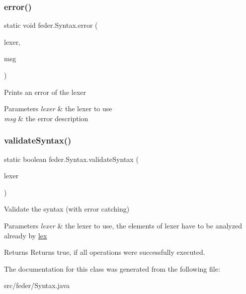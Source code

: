 \subsubsection{\texorpdfstring{error()}{error()}\hspace{0.1cm}{\footnotesize\ttfamily [2/2]}}
{\footnotesize\ttfamily static void feder.\+Syntax.\+error (\begin{DoxyParamCaption}\item[{\hyperlink{classfeder_1_1Lexer}{Lexer}}]{lexer,  }\item[{String}]{msg }\end{DoxyParamCaption})\hspace{0.3cm}{\ttfamily [static]}}

Prints an error of the lexer 
\begin{DoxyParams}{Parameters}
{\em lexer} & the lexer to use \\
\hline
{\em msg} & the error description \\
\hline
\end{DoxyParams}
\mbox{\label{classfeder_1_1Syntax_a1a609489260f826347f03bdd34f94b98}} 
\subsubsection{\texorpdfstring{validate\+Syntax()}{validateSyntax()}}
{\footnotesize\ttfamily static boolean feder.\+Syntax.\+validate\+Syntax (\begin{DoxyParamCaption}\item[{\hyperlink{classfeder_1_1Lexer}{Lexer}}]{lexer }\end{DoxyParamCaption})\hspace{0.3cm}{\ttfamily [static]}}

Validate the syntax (with error catching) 
\begin{DoxyParams}{Parameters}
{\em lexer} & the lexer to use, the elements of lexer have to be analyzed already by \hyperlink{classfeder_1_1Lexer_a69679a02624d16be3b567fd2aa71be57}{lex } \\
\hline
\end{DoxyParams}
\begin{DoxyReturn}{Returns}
Returns true, if all operations were successfully executed. 
\end{DoxyReturn}


The documentation for this class was generated from the following file\+:\begin{DoxyCompactItemize}
\item 
src/feder/Syntax.\+java\end{DoxyCompactItemize}
